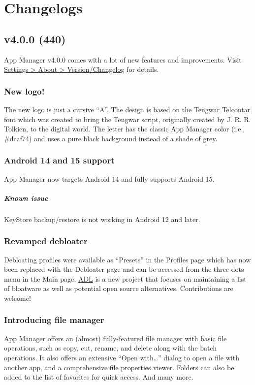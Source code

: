 \chapter{Changelogs}\label{ch:changelogs} %

\section{v4.0.0 (440)}\label{sec:v4.0.0-(440)}

App Manager v4.0.0 comes with a lot of new features and improvements. Visit
\href{app-manager://settings/about/version}{Settings > About > Version/Changelog} for details.

\subsection{New logo!}
The new logo is just a cursive ``A''. The design is based on the
\href{https://freetengwar.sourceforge.net/}{Tengwar Telcontar} font which was created to bring the
Tengwar script, originally created by J. R. R. Tolkien, to the digital world. The letter has the
classic App Manager color (i.e., \#dcaf74) and uses a pure black background instead of a shade of
grey.

\subsection{Android 14 and 15 support}
App Manager now targets Android 14 and fully supports Android 15.

\paragraph{Known issue} KeyStore backup/restore is not working in Android 12 and later.

\subsection{Revamped debloater}
Debloating profiles were available as ``Presets'' in the Profiles page which has now been replaced
with the Debloater page and can be accessed from the three-dots menu in the Main page.
\href{https://github.com/MuntashirAkon/android-debloat-list}{ADL} is a new project that focuses on
maintaining a list of bloatware as well as potential open source alternatives. Contributions are
welcome!

\subsection{Introducing file manager}
App Manager offers an (almost) fully-featured file manager with basic file operations, such as copy,
cut, rename, and delete along with the batch operations. It also offers an extensive ``Open with\dots''
dialog to open a file with another app, and a comprehensive file properties viewer. Folders can also
be added to the list of favorites for quick access. And many more.

